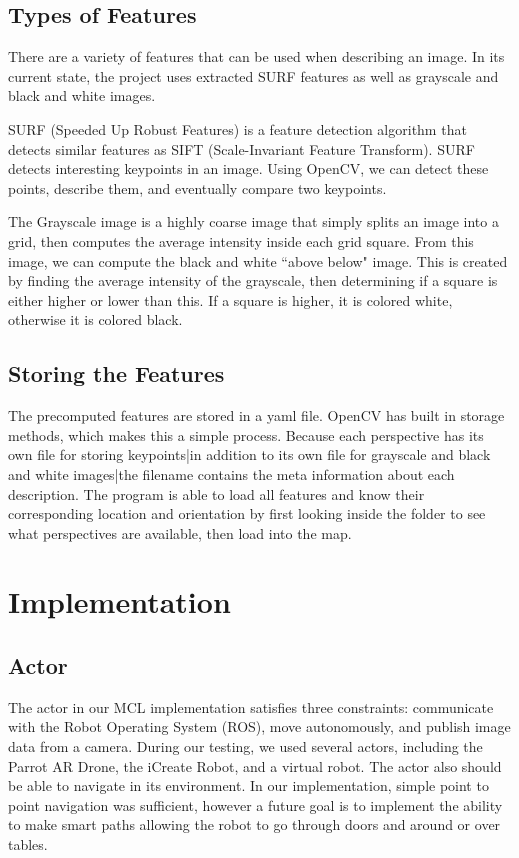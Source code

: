 \documentclass[a4paper,11pt]{article}
\begin{document}
  \subsection{Types of Features}
There are a variety of features that can be used when describing an image. In its current state, the project uses extracted SURF features as well as grayscale and black and white images.

SURF (Speeded Up Robust Features) is a feature detection algorithm that detects similar features as SIFT (Scale-Invariant Feature Transform). SURF detects interesting keypoints in an image. Using OpenCV, we can detect these points, describe them, and eventually compare two keypoints.

The Grayscale image is a highly coarse image that simply splits an image into a grid, then computes the average intensity inside each grid square. From this image, we can compute the black and white ``above below" image. This is created by finding the average intensity of the grayscale, then determining if a square is either higher or lower than this. If a square is higher, it is colored white, otherwise it is colored black.

  \subsection{Storing the Features}
The precomputed features are stored in a yaml file. OpenCV has built in storage methods, which makes this a simple process. Because each perspective has its own file for storing keypoints|in addition to its own file for grayscale and black and white images|the filename contains the meta information about each description. The program is able to load all features and know their corresponding location and orientation by first looking inside the folder to see what perspectives are available, then load into the map.

  \section{Implementation}
   
 \subsection{Actor}
The actor in our MCL implementation satisfies three constraints: communicate with the Robot Operating System (ROS), move autonomously, and publish image data from a camera. During our testing, we used several actors, including the Parrot AR Drone, the iCreate Robot, and a virtual robot. The actor also should be able to navigate in its environment. In our implementation, simple point to point navigation was sufficient, however a future goal is to implement the ability to make smart paths allowing the robot to go through doors and around or over tables.
\end{document}

